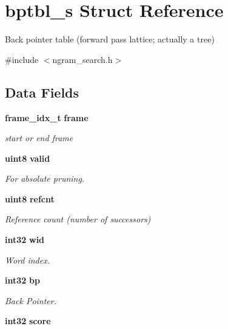 \section{bptbl\-\_\-s \-Struct \-Reference}
\label{structbptbl__s}


\-Back pointer table (forward pass lattice; actually a tree)  




{\ttfamily \#include $<$ngram\-\_\-search.\-h$>$}

\subsection*{\-Data \-Fields}
\begin{DoxyCompactItemize}
\item 
{\bf frame\-\_\-idx\-\_\-t} {\bf frame}\label{structbptbl__s_ae52081dde905cf6e7d988cdeb4c9b8b3}

\begin{DoxyCompactList}\small\item\em start or end frame \end{DoxyCompactList}\item 
{\bf uint8} {\bf valid}\label{structbptbl__s_a4948439666e1e2204a6d1c6d9cfd1cd0}

\begin{DoxyCompactList}\small\item\em \-For absolute pruning. \end{DoxyCompactList}\item 
{\bf uint8} {\bf refcnt}\label{structbptbl__s_acdc7410a4069418879aa022f9b61c13d}

\begin{DoxyCompactList}\small\item\em \-Reference count (number of successors) \end{DoxyCompactList}\item 
{\bf int32} {\bf wid}\label{structbptbl__s_a143ff0891fafd471000df7c73123b8a7}

\begin{DoxyCompactList}\small\item\em \-Word index. \end{DoxyCompactList}\item 
{\bf int32} {\bf bp}\label{structbptbl__s_a4ca45ebc4a1ac18fc0596195e7e03bc8}

\begin{DoxyCompactList}\small\item\em \-Back \-Pointer. \end{DoxyCompactList}\item 
{\bf int32} {\bf score}\label{structbptbl__s_aa5643c0c19ce4d39d51ddf7376f4d508}


\end{DoxyCompactItemize}
